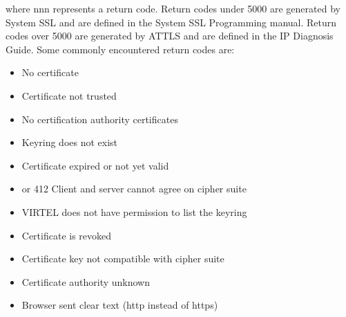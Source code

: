 \documentclass[letterpaper,10pt,english]{sphinxmanual}
\begin{document}
\sphinxAtStartPar
where nnn represents a return code. Return codes under 5000 are generated by System SSL and are defined in the System SSL Programming manual. Return codes over 5000 are generated by AT\sphinxhyphen{}TLS and are defined in the IP Diagnosis Guide. Some commonly encountered return codes are:
\begin{itemize}
\item {} 
 No certificate

\item {} 
 Certificate not trusted

\item {} 
 No certification authority certificates

\item {} 
 Keyring does not exist

\item {} 
 Certificate expired or not yet valid

\item {} 
 or 412 Client and server cannot agree on cipher suite

\item {} 
 VIRTEL does not have permission to list the keyring

\item {} 
 Certificate is revoked

\item {} 
 Certificate key not compatible with cipher suite

\item {} 
 Certificate authority unknown

\item {} 
 Browser sent clear text (http instead of https)

\end{itemize}
\end{document}
